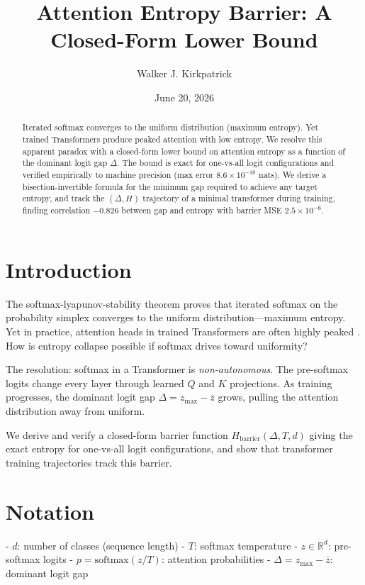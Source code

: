 \documentclass[11pt,a4paper]{amsart}
\title{Attention Entropy Barrier: A Closed-Form Lower Bound}
\author{Walker J. Kirkpatrick}
\date{June 20, 2026}
\theoremstyle{plain}
\theoremstyle{definition}
\begin{document}
\maketitle

\begin{abstract}
Iterated softmax converges to the uniform distribution (maximum
entropy). Yet trained Transformers produce peaked attention with low
entropy. We resolve this apparent paradox with a closed-form lower
bound on attention entropy as a function of the dominant logit gap
$\Delta$. The bound is exact for one-vs-all logit configurations and
verified empirically to machine precision (max error $8.6 \times
10^{-10}$ nats). We derive a bisection-invertible formula for the
minimum gap required to achieve any target entropy, and track the
$(\Delta, H)$ trajectory of a minimal transformer during training,
finding correlation $-0.826$ between gap and entropy with barrier
MSE $2.5 \times 10^{-6}$.
\end{abstract}

\section{Introduction}

The softmax-lyapunov-stability theorem \cite{kirkpatrick2026a} proves
that iterated softmax on the probability simplex converges to the
uniform distribution---maximum entropy. Yet in practice, attention
heads in trained Transformers are often highly peaked
\cite{attention-sink}. How is entropy collapse possible if softmax
drives toward uniformity?

The resolution: softmax in a Transformer is \emph{non-autonomous}.
The pre-softmax logits change every layer through learned $Q$ and
$K$ projections. As training progresses, the dominant logit gap
$\Delta = z_{\max} - \overline{z}$ grows, pulling the attention
distribution away from uniform.

We derive and verify a closed-form barrier function $H_{\text{barrier}}(\Delta, T, d)$
giving the exact entropy for one-vs-all logit configurations, and
show that transformer training trajectories track this barrier.

\section{Notation}

- $d$: number of classes (sequence length)
- $T$: softmax temperature
- $z \in \mathbb{R}^d$: pre-softmax logits
- $p = \text{softmax}(z/T)$: attention probabilities
- $\Delta = z_{\max} - \overline{z}$: dominant logit gap
\end{document}
